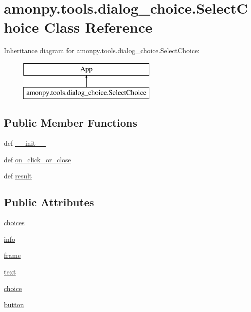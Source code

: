 \hypertarget{classamonpy_1_1tools_1_1dialog__choice_1_1_select_choice}{\section{amonpy.\-tools.\-dialog\-\_\-choice.\-Select\-Choice Class Reference}
\label{classamonpy_1_1tools_1_1dialog__choice_1_1_select_choice}
}
Inheritance diagram for amonpy.\-tools.\-dialog\-\_\-choice.\-Select\-Choice\-:\begin{figure}[H]
\begin{center}
\leavevmode
\includegraphics[height=2.000000cm]{classamonpy_1_1tools_1_1dialog__choice_1_1_select_choice}
\end{center}
\end{figure}
\subsection*{Public Member Functions}
\begin{DoxyCompactItemize}
\item 
def \hyperlink{classamonpy_1_1tools_1_1dialog__choice_1_1_select_choice_a9ffb7fd1e40656e936f4485e5c3b3c6e}{\-\_\-\-\_\-init\-\_\-\-\_\-}
\item 
def \hyperlink{classamonpy_1_1tools_1_1dialog__choice_1_1_select_choice_ac31e6372528c3039e831163f6e6bb939}{on\-\_\-click\-\_\-or\-\_\-close}
\item 
def \hyperlink{classamonpy_1_1tools_1_1dialog__choice_1_1_select_choice_a8bca0cecf2d89c6936849f69671d9945}{result}
\end{DoxyCompactItemize}
\subsection*{Public Attributes}
\begin{DoxyCompactItemize}
\item 
\hyperlink{classamonpy_1_1tools_1_1dialog__choice_1_1_select_choice_a8363438c3e75f765ca4b2c98eaf26699}{choices}
\item 
\hyperlink{classamonpy_1_1tools_1_1dialog__choice_1_1_select_choice_ab2d0390c17c73e14838add2d52d0f73d}{info}
\item 
\hyperlink{classamonpy_1_1tools_1_1dialog__choice_1_1_select_choice_a177ab137db91d1da6fa02abc917efe06}{frame}
\item 
\hyperlink{classamonpy_1_1tools_1_1dialog__choice_1_1_select_choice_a7823bcbaf7fa0bac5c175828edb1fc67}{text}
\item 
\hyperlink{classamonpy_1_1tools_1_1dialog__choice_1_1_select_choice_a403bd725ee5183ba2cd5134d05b7af61}{choice}
\item 
\hyperlink{classamonpy_1_1tools_1_1dialog__choice_1_1_select_choice_ac385a7d49dee6e1be82e148d22a64717}{button}
\end{DoxyCompactItemize}


